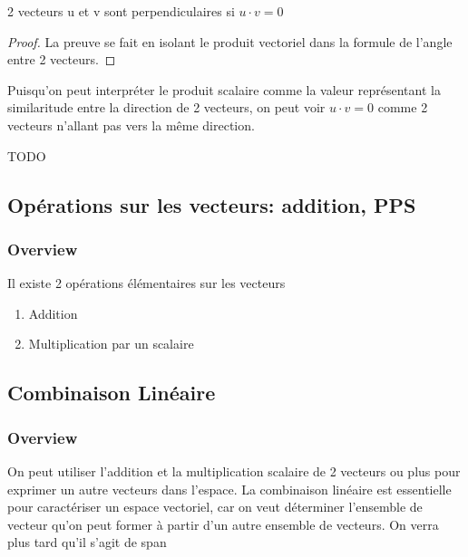 \documentclass{article}
\begin{document}
\begin{theorem}
    2 vecteurs u et v sont perpendiculaires si $ u \cdot v = 0$
\end{theorem}

\begin{proof}
    La preuve se fait en isolant le produit vectoriel dans la formule de
    l'angle entre 2 vecteurs.
\end{proof}

\begin{intuition}
    Puisqu'on peut interpréter le produit scalaire comme la valeur représentant
    la similaritude entre la direction de 2 vecteurs, on peut voir
    $ u \cdot v = 0$ comme 2 vecteurs n'allant pas vers la même direction.
\end{intuition}

\begin{remark}
    TODO
\end{remark}

\subsection{Opérations sur les vecteurs: addition, PPS}

\subsubsection{Overview}%
\label{ssub:Overview}

Il existe 2 opérations élémentaires sur les vecteurs
\begin{enumerate}
    \item Addition
    \item Multiplication par un scalaire
\end{enumerate}

\subsection{Combinaison Linéaire}%
\label{sub:Combinaison Linéaire}

\subsubsection{Overview}%
\label{ssub:Overview}

On peut utiliser l'addition et la multiplication scalaire de 2 vecteurs ou plus
pour exprimer un autre vecteurs dans l'espace. La combinaison linéaire est
essentielle pour caractériser un espace vectoriel, car on veut déterminer
l'ensemble de vecteur qu'on peut former à partir d'un autre ensemble de
vecteurs. On verra plus tard qu'il s'agit de span
\end{document}
